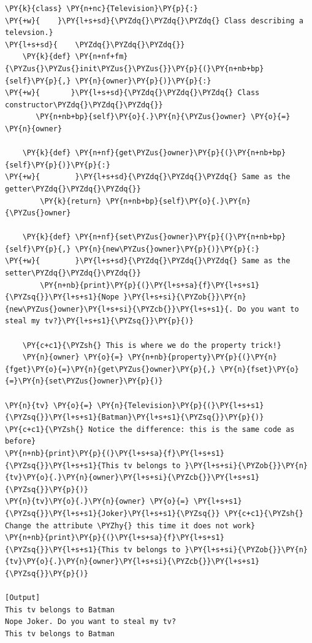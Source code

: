 \begin{Verbatim}[label=\makebox{\url{https://github.com/lucabaldini/cmepda/tree/master/slides/latex/snippets/class\_tv\_encapsulation\_properties\_verbose.py}},commandchars=\\\{\}]
\PY{k}{class} \PY{n+nc}{Television}\PY{p}{:}
\PY{+w}{    }\PY{l+s+sd}{\PYZdq{}\PYZdq{}\PYZdq{} Class describing a televsion.}
\PY{l+s+sd}{    \PYZdq{}\PYZdq{}\PYZdq{}}
    \PY{k}{def} \PY{n+nf+fm}{\PYZus{}\PYZus{}init\PYZus{}\PYZus{}}\PY{p}{(}\PY{n+nb+bp}{self}\PY{p}{,} \PY{n}{owner}\PY{p}{)}\PY{p}{:}
\PY{+w}{       }\PY{l+s+sd}{\PYZdq{}\PYZdq{}\PYZdq{} Class constructor\PYZdq{}\PYZdq{}\PYZdq{}}
       \PY{n+nb+bp}{self}\PY{o}{.}\PY{n}{\PYZus{}owner} \PY{o}{=} \PY{n}{owner}

    \PY{k}{def} \PY{n+nf}{get\PYZus{}owner}\PY{p}{(}\PY{n+nb+bp}{self}\PY{p}{)}\PY{p}{:}
\PY{+w}{        }\PY{l+s+sd}{\PYZdq{}\PYZdq{}\PYZdq{} Same as the getter\PYZdq{}\PYZdq{}\PYZdq{}}
        \PY{k}{return} \PY{n+nb+bp}{self}\PY{o}{.}\PY{n}{\PYZus{}owner}

    \PY{k}{def} \PY{n+nf}{set\PYZus{}owner}\PY{p}{(}\PY{n+nb+bp}{self}\PY{p}{,} \PY{n}{new\PYZus{}owner}\PY{p}{)}\PY{p}{:}
\PY{+w}{        }\PY{l+s+sd}{\PYZdq{}\PYZdq{}\PYZdq{} Same as the setter\PYZdq{}\PYZdq{}\PYZdq{}}
        \PY{n+nb}{print}\PY{p}{(}\PY{l+s+sa}{f}\PY{l+s+s1}{\PYZsq{}}\PY{l+s+s1}{Nope }\PY{l+s+si}{\PYZob{}}\PY{n}{new\PYZus{}owner}\PY{l+s+si}{\PYZcb{}}\PY{l+s+s1}{. Do you want to steal my tv?}\PY{l+s+s1}{\PYZsq{}}\PY{p}{)}

    \PY{c+c1}{\PYZsh{} This is where we do the property trick!}
    \PY{n}{owner} \PY{o}{=} \PY{n+nb}{property}\PY{p}{(}\PY{n}{fget}\PY{o}{=}\PY{n}{get\PYZus{}owner}\PY{p}{,} \PY{n}{fset}\PY{o}{=}\PY{n}{set\PYZus{}owner}\PY{p}{)}

\PY{n}{tv} \PY{o}{=} \PY{n}{Television}\PY{p}{(}\PY{l+s+s1}{\PYZsq{}}\PY{l+s+s1}{Batman}\PY{l+s+s1}{\PYZsq{}}\PY{p}{)}
\PY{c+c1}{\PYZsh{} Notice the difference: this is the same code as before}
\PY{n+nb}{print}\PY{p}{(}\PY{l+s+sa}{f}\PY{l+s+s1}{\PYZsq{}}\PY{l+s+s1}{This tv belongs to }\PY{l+s+si}{\PYZob{}}\PY{n}{tv}\PY{o}{.}\PY{n}{owner}\PY{l+s+si}{\PYZcb{}}\PY{l+s+s1}{\PYZsq{}}\PY{p}{)}
\PY{n}{tv}\PY{o}{.}\PY{n}{owner} \PY{o}{=} \PY{l+s+s1}{\PYZsq{}}\PY{l+s+s1}{Joker}\PY{l+s+s1}{\PYZsq{}} \PY{c+c1}{\PYZsh{} Change the attribute \PYZhy{} this time it does not work}
\PY{n+nb}{print}\PY{p}{(}\PY{l+s+sa}{f}\PY{l+s+s1}{\PYZsq{}}\PY{l+s+s1}{This tv belongs to }\PY{l+s+si}{\PYZob{}}\PY{n}{tv}\PY{o}{.}\PY{n}{owner}\PY{l+s+si}{\PYZcb{}}\PY{l+s+s1}{\PYZsq{}}\PY{p}{)}

[Output]
This tv belongs to Batman
Nope Joker. Do you want to steal my tv?
This tv belongs to Batman
\end{Verbatim}